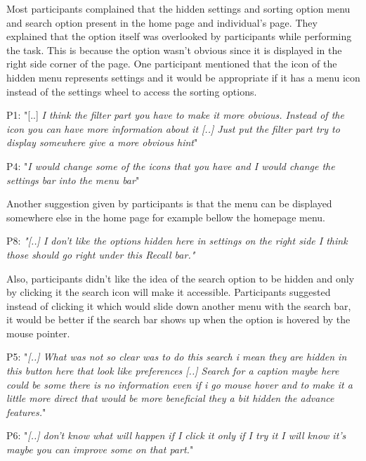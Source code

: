 \documentclass[mscthesis]{usiinfthesis}
\begin{document}
Most participants complained that the hidden settings and sorting option menu and search option present in the home page and individual's page. They explained that the option itself was overlooked by participants while performing the task. This is because the option wasn't obvious since it is displayed in the right side corner of the page. One participant mentioned that the icon of the hidden menu represents settings and it would be appropriate if it has a menu icon instead of the settings wheel to access the sorting options.
\newline
\begin{adjustwidth}{1cm}{1cm}
\hspace{\parindent}P1: "[..] \textit{I think the filter part you have to make it more obvious. Instead of the icon you can have more information about it [..] Just put the filter part try to display somewhere give a more obvious hint}"

P4: "\textit{I would change some of the icons that you have and I would change the settings bar into the menu bar}"
\newline
\end{adjustwidth}
Another suggestion given by participants is that the menu can be displayed somewhere else in the home page for example bellow the homepage menu.
\newline
\begin{adjustwidth}{1cm}{1cm}
\hspace{\parindent}P8: \textit{"[..] I don't like the options hidden here in settings on the right side I think those should go right under this Recall bar."}
\newline
\end{adjustwidth}
Also, participants didn't like the idea of the search option to be hidden and only by clicking it the search icon will make it accessible. Participants suggested instead of clicking it which would slide down another menu with the search bar, it would be better if the search bar shows up when the option is hovered by the mouse pointer. 
\newline
\begin{adjustwidth}{1cm}{1cm}
\hspace{\parindent}P5: "\textit{[..] What was not so clear was to do this search i mean they are hidden in this button here that look like preferences [..] Search for a caption maybe here could be some there is no information even if i go mouse hover and to make it a little more direct that would be more beneficial they a bit hidden the advance features.}"

P6: "\textit{[..] don't know what will happen if I click it only if I try it I will know it's maybe you can improve some on that part.}"
\newline
\end{adjustwidth}
\end{document}
